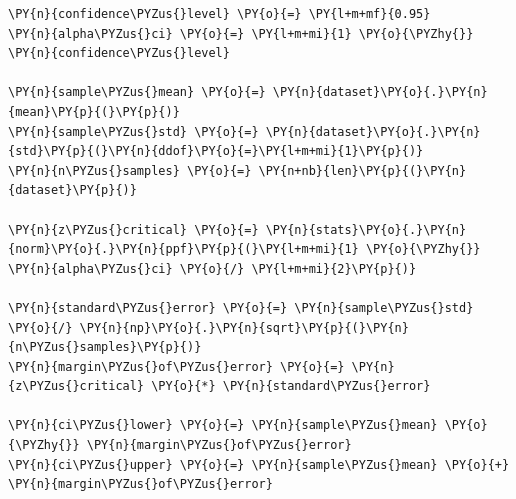     \begin{tcolorbox}[breakable, size=fbox, boxrule=1pt, pad at break*=1mm,colback=cellbackground, colframe=cellborder]
\begin{Verbatim}[commandchars=\\\{\}]
\PY{n}{confidence\PYZus{}level} \PY{o}{=} \PY{l+m+mf}{0.95}
\PY{n}{alpha\PYZus{}ci} \PY{o}{=} \PY{l+m+mi}{1} \PY{o}{\PYZhy{}} \PY{n}{confidence\PYZus{}level}

\PY{n}{sample\PYZus{}mean} \PY{o}{=} \PY{n}{dataset}\PY{o}{.}\PY{n}{mean}\PY{p}{(}\PY{p}{)}
\PY{n}{sample\PYZus{}std} \PY{o}{=} \PY{n}{dataset}\PY{o}{.}\PY{n}{std}\PY{p}{(}\PY{n}{ddof}\PY{o}{=}\PY{l+m+mi}{1}\PY{p}{)}
\PY{n}{n\PYZus{}samples} \PY{o}{=} \PY{n+nb}{len}\PY{p}{(}\PY{n}{dataset}\PY{p}{)}

\PY{n}{z\PYZus{}critical} \PY{o}{=} \PY{n}{stats}\PY{o}{.}\PY{n}{norm}\PY{o}{.}\PY{n}{ppf}\PY{p}{(}\PY{l+m+mi}{1} \PY{o}{\PYZhy{}} \PY{n}{alpha\PYZus{}ci} \PY{o}{/} \PY{l+m+mi}{2}\PY{p}{)}

\PY{n}{standard\PYZus{}error} \PY{o}{=} \PY{n}{sample\PYZus{}std} \PY{o}{/} \PY{n}{np}\PY{o}{.}\PY{n}{sqrt}\PY{p}{(}\PY{n}{n\PYZus{}samples}\PY{p}{)}
\PY{n}{margin\PYZus{}of\PYZus{}error} \PY{o}{=} \PY{n}{z\PYZus{}critical} \PY{o}{*} \PY{n}{standard\PYZus{}error}

\PY{n}{ci\PYZus{}lower} \PY{o}{=} \PY{n}{sample\PYZus{}mean} \PY{o}{\PYZhy{}} \PY{n}{margin\PYZus{}of\PYZus{}error}
\PY{n}{ci\PYZus{}upper} \PY{o}{=} \PY{n}{sample\PYZus{}mean} \PY{o}{+} \PY{n}{margin\PYZus{}of\PYZus{}error}


\end{Verbatim}
\end{tcolorbox}
